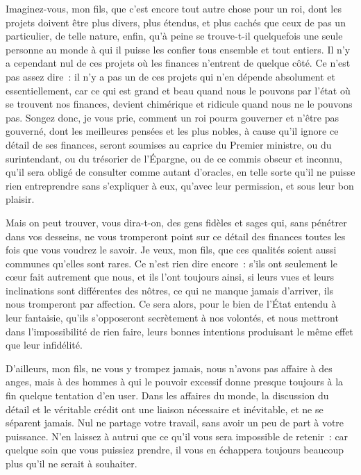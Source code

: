 \documentclass[french,twoside]{book} %
\begin{document}
Imaginez-vous, mon fils, que c’est encore tout autre chose pour un roi, dont les projets doivent être plus divers, plus étendus, et plus cachés que ceux de pas un particulier, de telle nature, enfin, qu’à peine se trouve-t-il quelquefois une seule personne au monde à qui il puisse les confier tous ensemble et tout entiers. Il n’y a cependant nul de ces projets où les finances n’entrent de quelque côté. Ce n’est pas assez dire : il n’y a pas un de ces projets qui n’en dépende absolument et essentiellement, car ce qui est grand et beau quand nous le pouvons par l’état où se trouvent nos finances, devient chimérique et ridicule quand nous ne le pouvons pas. Songez donc, je vous prie, comment un roi pourra gouverner et n’être pas gouverné, dont les meilleures pensées et les plus nobles, à cause qu’il ignore ce détail de ses finances, seront soumises au caprice du Premier ministre, ou du surintendant, ou du trésorier de l’Épargne, ou de ce commis obscur et inconnu, qu’il sera obligé de consulter comme autant d’oracles, en telle sorte qu’il ne puisse rien entreprendre sans s’expliquer à eux, qu’avec leur permission, et sous leur bon plaisir.\par
Mais on peut trouver, vous dira-t-on, des gens fidèles et sages qui, sans pénétrer dans vos desseins, ne vous tromperont point sur ce détail des finances toutes les fois que vous voudrez le savoir. Je veux, mon fils, que ces qualités soient aussi communes qu’elles sont rares. Ce n’est rien dire encore : s’ils ont seulement le cœur fait autrement que nous, et ils l’ont toujours ainsi, si leurs vues et leurs inclinations sont différentes des nôtres, ce qui ne manque jamais d’arriver, ils nous tromperont par affection. Ce sera alors, pour le bien de l’État entendu à leur fantaisie, qu’ils s’opposeront secrètement à nos volontés, et nous mettront dans l’impossibilité de rien faire, leurs bonnes intentions produisant le même effet que leur infidélité.\par
D’ailleurs, mon fils, ne vous y trompez jamais, nous n’avons pas affaire à des anges, mais à des hommes à qui le pouvoir excessif donne presque toujours à la fin quelque tentation d’en user. Dans les affaires du monde, la discussion du détail et le véritable crédit ont une liaison nécessaire et inévitable, et ne se séparent jamais. Nul ne partage votre travail, sans avoir un peu de part à votre puissance. N’en laissez à autrui que ce qu’il vous sera impossible de retenir : car quelque soin que vous puissiez prendre, il vous en échappera toujours beaucoup plus qu’il ne serait à souhaiter.\par
\end{document}
